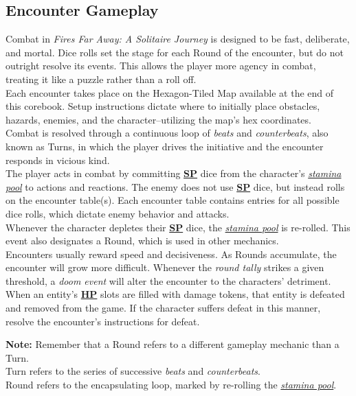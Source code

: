\documentclass[12pt]{article}
\newcommand{\refto}[1]{\hyperlink{#1}{\textbf{#1}}}
\newcommand{\reftoit}[1]{\hyperlink{#1}{\emph{#1}}}
\begin{document}
\begin{multicols*}{2}
\section{Encounter Gameplay}
Combat in \emph{Fires Far Away: A Solitaire Journey} is designed to be fast, deliberate, and mortal. Dice rolls set the stage for each Round of the encounter, but do not outright resolve its events. This allows the player more agency in combat, treating it like a puzzle rather than a roll off.\\
Each encounter takes place on the Hexagon-Tiled Map available at the end of this corebook. Setup instructions dictate where to initially place obstacles, hazards, enemies, and the character--utilizing the map’s hex coordinates.\\
Combat is resolved through a continuous loop of \emph{beats} and \emph{counterbeats}, also known as Turns, in which the player drives the initiative and the encounter responds in vicious kind.\\
The player acts in combat by committing \refto{SP} dice from the character’s \reftoit{stamina pool} to actions and reactions. The enemy does not use \refto{SP} dice, but instead rolls on the encounter table(s). Each encounter table contains entries for all possible dice rolls, which dictate enemy behavior and attacks.\\
Whenever the character depletes their \refto{SP} dice, the \reftoit{stamina pool} is re-rolled. This event also designates a Round, which is used in other mechanics.\\
Encounters usually reward speed and decisiveness. As Rounds accumulate, the encounter will grow more difficult. Whenever the \emph{round tally} strikes a given threshold, a \emph{doom event} will alter the encounter to the characters’ detriment.\\
When an entity’s \refto{HP} slots are filled with damage tokens, that entity is defeated and removed from the game. If the character suffers defeat in this manner, resolve the encounter’s instructions for defeat.\\
\begin{tcolorbox}
\textbf{Note:} Remember that a Round refers to a different gameplay mechanic than a Turn.\\
Turn refers to the series of successive \emph{beats} and \emph{counterbeats}.\\
Round refers to the encapsulating loop, marked by re-rolling the \reftoit{stamina pool}.
\end{tcolorbox}


\end{multicols*}
\end{document}
